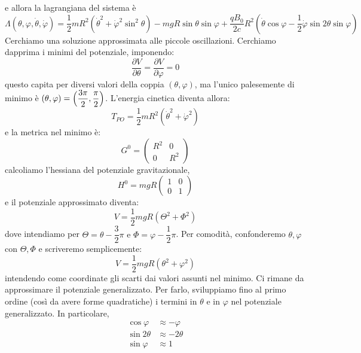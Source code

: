 \documentclass[a4paper,openany]{article}
\begin{document}
	e allora la lagrangiana del sistema è
	\begin{equation}\label{key}
		\Lambda(\theta,\varphi,\dot{\theta},\dot{\varphi}) = \dfrac{1}{2}mR^{2}(\dot{\theta}^{2}+\dot{\varphi}^{2}\sin^{2}\theta) - mgR\sin\theta\sin\varphi + \dfrac{qB_0}{2c}R^2(\dot{\theta}\cos\varphi-\dfrac{1}{2}\dot{\varphi}\sin2\theta\sin\varphi)
	\end{equation}
	Cerchiamo una soluzione approssimata alle piccole oscillazioni. Cerchiamo dapprima i minimi del potenziale, imponendo:
	$$
	\dfrac{\partial V}{\partial \theta} = \dfrac{\partial V}{\partial \varphi} = 0 
	$$
	questo capita per diversi valori della coppia $(\theta,\varphi)$, ma l'unico palesemente di minimo è $(\theta,\varphi) = \Bigl(\dfrac{3\pi}{2}, \dfrac{\pi}{2}\Bigl)$. L'energia cinetica diventa allora:
	$$
	T_{PO} = \dfrac{1}{2}mR^{2}(\dot{\theta}^{2}+\dot{\varphi}^{2})
	$$
	e la metrica nel minimo è:
	\begin{equation}\label{key}
		G^0 =
		\begin{pmatrix}
			R^2 & 0 \\
			0 & R^2 
		\end{pmatrix}
	\end{equation}
	calcoliamo l'hessiana del potenziale gravitazionale,
	\begin{equation}\label{key}
		H^0 =mgR
		\begin{pmatrix}
			1 & 0 \\
			0 & 1
		\end{pmatrix}
	\end{equation}
	e il potenziale approssimato diventa:
	\begin{equation}\label{key}
		V = \dfrac{1}{2}mgR(\Theta^{2}+\Phi^{2})
	\end{equation}
	dove intendiamo per $\Theta = \theta - \dfrac{3}{2}\pi \mbox{ e } \Phi = \varphi - \dfrac{1}{2}\pi$. Per comodità, confonderemo $\theta,\varphi$ con $\Theta,\Phi$ e scriveremo semplicemente: 
	\begin{equation}\label{key}
		V = \dfrac{1}{2}mgR(\theta^{2}+\varphi^{2})
	\end{equation}
	intendendo come coordinate gli scarti dai valori assunti nel minimo.
	Ci rimane da approssimare il potenziale generalizzato. Per farlo, sviluppiamo fino al primo ordine (così da avere forme quadratiche) i termini in $\theta$ e in $\varphi$ nel potenziale generalizzato. In particolare,
	\begin{equation}\label{key}
		\begin{aligned}
			\cos\varphi &\approx - \varphi
			\\
			\sin2\theta &\approx -2\theta \\
			\sin\varphi &\approx 1 
		\end{aligned}
	\end{equation}
\end{document}
